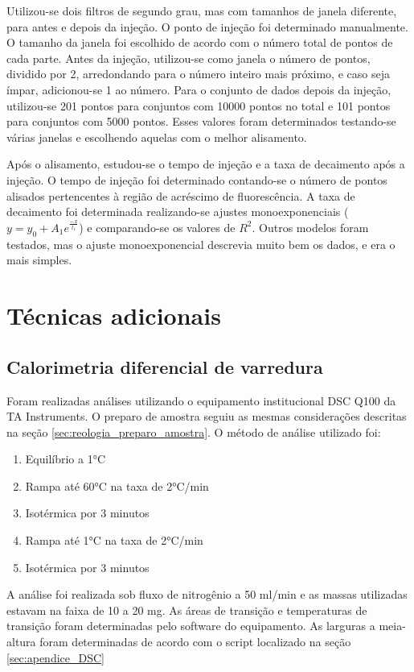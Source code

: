 			Utilizou-se dois filtros de segundo grau, mas com tamanhos de janela diferente, para antes e depois da injeção. O ponto de injeção foi determinado manualmente. O tamanho da janela foi escolhido de acordo com o número total de pontos de cada parte. Antes da injeção, utilizou-se como janela o número de pontos, dividido por 2, arredondando para o número inteiro mais próximo, e caso seja ímpar, adicionou-se 1 ao número. Para o conjunto de dados depois da injeção, utilizou-se 201 pontos para conjuntos com 10000 pontos no total e 101 pontos para conjuntos com 5000 pontos. Esses valores foram determinados testando-se várias janelas e escolhendo aquelas com o melhor alisamento.
			
			Após o alisamento, estudou-se o tempo de injeção e a taxa de decaimento após a injeção. O tempo de injeção foi determinado contando-se o número de pontos alisados pertencentes à região de acréscimo de fluorescência. A taxa de decaimento foi determinada realizando-se ajustes monoexponenciais (\(y = y_0 + A_1 e^{\frac{-x}{t_1}}\)) e comparando-se os valores de \(R^2\). Outros modelos foram testados, mas o ajuste monoexponencial descrevia muito bem os dados, e era o mais simples.
		
	\chapter{Técnicas adicionais}
		\section{Calorimetria diferencial de varredura}
		
		Foram realizadas análises utilizando o equipamento institucional DSC Q100 da TA Instruments. O preparo de amostra seguiu as mesmas considerações descritas na seção \ref{sec:reologia_preparo_amostra}. O método de análise utilizado foi:
		
		\begin{enumerate}
			\item Equilíbrio a 1°C
			\item Rampa até 60°C na taxa de 2°C/min
			\item Isotérmica por 3 minutos
			\item Rampa até 1°C na taxa de 2°C/min
			\item Isotérmica por 3 minutos
		\end{enumerate}
		
		A análise foi realizada sob fluxo de nitrogênio a 50 ml/min e as massas utilizadas estavam na faixa de 10 a 20 mg. As áreas de transição e temperaturas de transição foram determinadas pelo software do equipamento. As larguras a meia-altura foram determinadas de acordo com o script localizado na seção \ref{sec:apendice_DSC}
		
